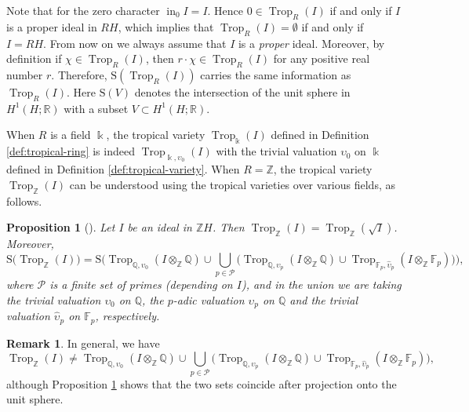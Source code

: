 \documentclass[11pt]{amsart}
\newtheorem{proposition}[theorem]{Proposition}
\theoremstyle{definition}
\newtheorem{remark}[theorem]{Remark}
\newcommand{\Z}{\mathbb{Z}}
\newcommand{\Q}{\mathbb{Q}}
\newcommand{\R}{\mathbb{R}}
\newcommand{\F}{\mathbb{F}}
\renewcommand{\k}{\Bbbk}
\newcommand{\PP}{\mathcal{P}}
\newcommand{\rS}{\mathrm{S}}
\DeclareMathOperator{\init}{in}
\DeclareMathOperator{\Trop}{Trop}
\begin{document}
Note that for the zero character $\init_{0} I=I$.
Hence $0\in \Trop_R(I)$ if and only if $I$ is a proper ideal in $RH$, 
which implies that $\Trop_R (I)=\emptyset$ if and only if $I=RH$. 
From now on we always assume that $I$ is a \textit{proper} ideal. 
Moreover, by definition if $\chi\in\Trop_R (I)$, then $r\cdot\chi\in\Trop_R (I)$ 
for any positive real number $r$. Therefore, $\rS(\Trop_R(I))$ 
carries the same information as $\Trop_R(I)$. Here $\rS(V)$ 
denotes the intersection of the unit sphere in $H^1(H;\R)$ 
with a subset $V \subset H^1(H;\R)$. 

When $R$ is a field $\k$, the tropical variety $\Trop_\k(I)$ defined in 
Definition \ref{def:tropical-ring} is indeed  $\Trop_{\k, \upsilon_0}(I)$ 
with the trivial valuation $\upsilon_0$ on $\k$ defined in 
Definition \ref{def:tropical-variety}. When $R=\Z$, the tropical 
variety $\Trop_\Z(I)$ can be understood using the 
tropical varieties over various fields, as follows. 

\begin{proposition}[{\cite[Prop.~3.9]{LL}}]
\label{prop:three-trop-union-Z}
Let $I$ be an ideal in $\Z H$. Then $\Trop_\Z(I)=\Trop_\Z(\sqrt{I})$. 
Moreover, 
\[
\rS\big(\Trop_\Z(I)\big) = 
\rS\Big(\Trop_{\Q,\upsilon_0}(I\otimes_\Z \Q)\cup\bigcup\limits_{p \in \PP}
\big(\Trop_{\Q,\upsilon_p}(I\otimes_\Z \Q)\cup \Trop_{\F_p,\hat{\upsilon}_p}(I\otimes_\Z \F_p)\big)
\Big),
\]
where $\PP$ is a finite set of primes (depending on $I$), and 
in the union we are taking the trivial valuation $\upsilon_0$ on $\Q$, 
the $p$-adic valuation $\upsilon_p$ on $\Q$ and the trivial valuation 
$\hat{\upsilon}_p$ on $\F_p$, respectively. 
\end{proposition} 

\begin{remark}
\label{rem:tropical over Z}
In general, we have
\[
\Trop_\Z(I) \neq \Trop_{\Q,\upsilon_0}(I\otimes_{\Z}\Q)\cup\bigcup\limits_{p \in \PP}
\big(\Trop_{\Q,\upsilon_p}(I\otimes_{\Z}\Q)\cup \Trop_{\F_p,\hat{\upsilon}_p}(I\otimes_{\Z}\F_p)\big),
\]
although Proposition \ref{prop:three-trop-union-Z} shows that 
the two sets coincide after projection onto the unit sphere.   
\end{remark}
\end{document}
